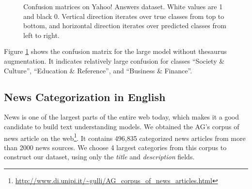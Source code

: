 \documentclass{article}
\begin{document}
\begin{CJK}{UTF8}{gbsn}
\begin{figure}[ht]
  \centering
  \caption{Confusion matrices on Yahoo! Answers dataset. White values are 1 and black 0. Vertical direction iterates over true classes from top to bottom, and horizontal direction iterates over predicted classes from left to right.}
  \label{fig:yadc}
\end{figure}

Figure \ref{fig:yadc} shows the confusion matrix for the large model without thesaurus augmentation. It indicates relatively large confusion for classes ``Society \& Culture'', ``Education \& Reference'', and ``Business \& Finance''.

\subsection{News Categorization in English}

News is one of the largest parts of the entire web today, which makes it a good candidate to build text understanding models. We obtained the AG's corpus of news article on the web\footnote{\url{http://www.di.unipi.it/~gulli/AG_corpus_of_news_articles.html}}. It contains 496,835 categorized news articles from more than 2000 news sources. We choose 4 largest categories from this corpus to construct our dataset, using only the \textit{title} and \textit{description} fields.


\end{CJK}
\end{document}
